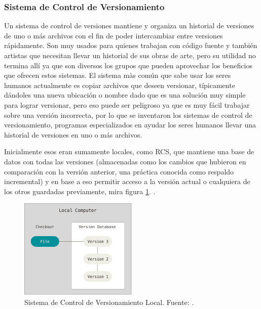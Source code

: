 \subsubsection{Sistema de Control de Versionamiento}
Un sistema de control de versiones mantiene y organiza un historial de versiones de uno o más archivos con el fin de poder intercambiar entre versiones rápidamente. Son muy usados para quienes trabajan con código fuente y también artistas \citep{PROGIT-Git-VCS} que necesitan llevar un historial de sus obras de arte, pero su utilidad no termina allí ya que son diversos los grupos que pueden aprovechar los beneficios que ofrecen estos sistemas. El sistema màs común que sabe usar los seres humanos actualmente es copiar archivos que deseen versionar, típicamente dándoles una nueva ubicación o nombre dado que es una solución muy simple para lograr versionar, pero eso puede ser peligroso ya que es muy fácil trabajar sobre una versión incorrecta, por lo que se inventaron los sistemas de control de versionamiento, programas especializados en ayudar los seres humanos llevar una historial de versiones en uno o más archivos.

Inicialmente esos eran sumamente locales, como RCS, que mantiene una base de datos con todas las versiones (almacenadas como los cambios que hubieron en comparación con la versión anterior, una práctica conocida como respaldo incremental) y en base a eso permitir acceso a la versión actual o cualquiera de los otros guardadas previamente, mira figura \ref{LVCS}. \citep{PROGIT-Git-VCS}.

\begin{figure}
  \begin{center}
    \includegraphics[width=0.5\textwidth]{Figures/lvcs.png}
  \end{center}
  \caption{Sistema de Control de Versionamiento Local. Fuente: \citep{PROGIT-Git-VCS}.}
  \label{LVCS}
\end{figure}

